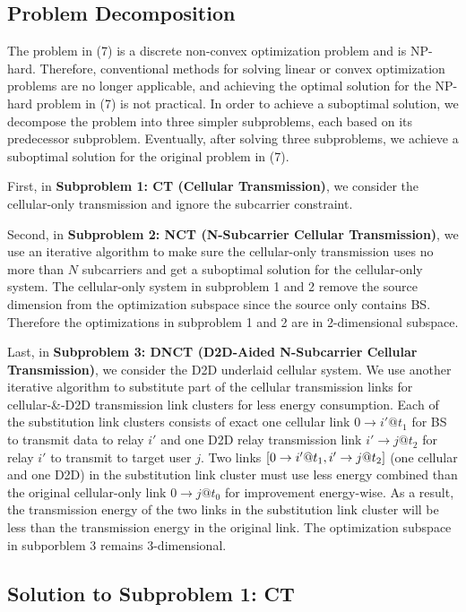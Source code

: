 \documentclass{ieeeaccess}
\begin{document}
\subsection{Problem Decomposition}

The problem in (7) is a discrete non-convex optimization problem and is NP-hard. Therefore, conventional methods for solving linear or convex optimization problems are no longer applicable, and achieving the optimal solution for the NP-hard problem in (7) is not practical. 
In order to achieve a suboptimal solution, we decompose the problem into three simpler subproblems, each based on its predecessor subproblem. Eventually, after solving three subproblems, we achieve a suboptimal solution for the original problem in (7).

First, in \textbf{Subproblem 1: CT (Cellular Transmission)}, we consider the cellular-only transmission and ignore the subcarrier constraint. 

Second, in \textbf{Subproblem 2: NCT (N-Subcarrier Cellular Transmission)}, we use an iterative algorithm to make sure the cellular-only transmission uses no more than $N$ subcarriers and get a suboptimal solution for the cellular-only system. The cellular-only system in subproblem 1 and 2 remove the source dimension from the optimization subspace since the source only contains BS. Therefore the optimizations in subproblem 1 and 2 are in 2-dimensional subspace.

Last, in \textbf{Subproblem 3: DNCT (D2D-Aided N-Subcarrier Cellular Transmission)}, we consider the D2D underlaid cellular system. We use another iterative algorithm to substitute part of the cellular transmission links for cellular-\&-D2D transmission link clusters for less energy consumption. Each of the substitution link clusters consists of exact one cellular link $0 \to i'@{t_1}$ for BS to transmit data to relay ${i'}$ and one D2D relay transmission link $i' \to j@{t_2}$ for relay ${i'}$ to transmit to target user $j$. Two links $\left[ {{\rm{0}} \to i'@{t_1},i' \to j@{t_2}} \right]$ (one cellular and one D2D) in the substitution link cluster must use less energy combined than the original cellular-only link $0 \to j@{t_0}$ for improvement energy-wise. As a result, the transmission energy of the two links in the substitution link cluster will be less than the transmission energy in the original link. The optimization subspace in subporblem 3 remains 3-dimensional.

\subsection{Solution to \textbf{Subproblem 1: CT}}
\end{document}
